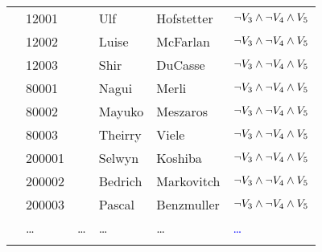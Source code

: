 \begin{table}[!htbp]
\begin{tabular} {c !{\color{black}\vrule} l l l l : l }
 & 12001 & & Ulf & Hofstetter & \textcolor{blue}{$\neg \vThree \wedge \neg \vFour \wedge \vFive$}\\
& 12002 & & Luise & McFarlan& \textcolor{blue}{$\neg \vThree \wedge \neg \vFour \wedge \vFive$}\\
& 12003 & & Shir & DuCasse& \textcolor{blue}{$\neg \vThree \wedge \neg \vFour \wedge \vFive$}\\
 &80001 & & Nagui & Merli& \textcolor{blue}{$\neg \vThree \wedge \neg \vFour \wedge \vFive$}\\
 & 80002 & & Mayuko & Meszaros& \textcolor{blue}{$\neg \vThree \wedge \neg \vFour \wedge \vFive$}\\
 & 80003 & & Theirry & Viele& \textcolor{blue}{$\neg \vThree \wedge \neg \vFour \wedge \vFive$}\\
 & 200001 & & Selwyn & Koshiba & \textcolor{blue}{$\neg \vThree \wedge \neg \vFour \wedge \vFive$}\\
 & 200002 & & Bedrich & Markovitch & \textcolor{blue}{$\neg \vThree \wedge \neg \vFour \wedge \vFive$}\\
 & 200003 & & Pascal & Benzmuller & \textcolor{blue}{$\neg \vThree \wedge \neg \vFour \wedge \vFive$} \\
 & \ldots & \ldots & \ldots & \ldots & \textcolor{blue}{\ldots}\\
\hline
\end{tabular}

\end{table}

